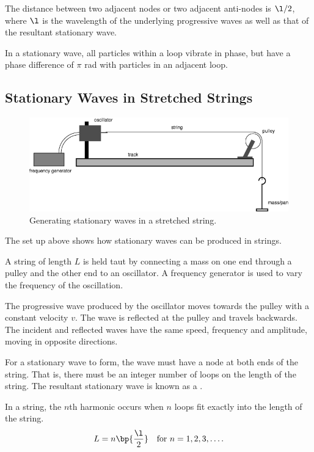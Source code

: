 The distance between two adjacent nodes or two adjacent anti-nodes is $\l/2$, where $\l$ is the wavelength of the underlying progressive waves as well as that of the resultant stationary wave.

In a stationary wave, all particles within a loop vibrate in phase, but have a phase difference of $\pi$ rad with particles in an adjacent loop.

\subsection{Stationary Waves in Stretched Strings}

\begin{figure}[H]
    \centering
    \includegraphics[scale=0.4]{media/Stationary Wave in Stretched String.png}
    \caption{Generating stationary waves in a stretched string.\protect\footnotemark}
\end{figure}

The set up above shows how stationary waves can be produced in strings.

A string of length $L$ is held taut by connecting a mass on one end through a pulley and the other end to an oscillator. A frequency generator is used to vary the frequency of the oscillation.

The progressive wave produced by the oscillator moves towards the pulley with a constant velocity $v$. The wave is reflected at the pulley and travels backwards. The incident and reflected waves have the same speed, frequency and amplitude, moving in opposite directions.

For a stationary wave to form, the wave must have a node at both ends of the string. That is, there must be an integer number of loops on the length of the string. The resultant stationary wave is known as a .

\begin{proposition}
    In a string, the $n$th harmonic occurs when $n$ loops fit exactly into the length of the string. \[L = n\bp{\frac{\l}{2}} \quad \text{for $n = 1, 2, 3, \dots$}.\]
\end{proposition}

